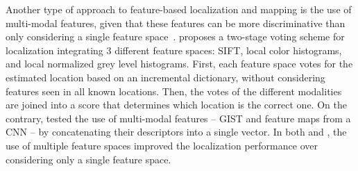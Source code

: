 Another type of approach to feature-based localization and mapping is the use of multi-modal features, given that these features can be more discriminative than only considering a single feature space~\parencite{latif-et-al:2017:016}.
\cite{filliat:2007:364080} proposes a two-stage voting scheme for localization integrating 3 different feature spaces: SIFT, local color histograms, and local normalized grey level histograms. First, each feature space votes for the estimated location based on an incremental dictionary, without considering features seen in all known locations. Then, the votes of the different modalities are joined into a score that determines which location is the correct one.
On the contrary, \cite{latif-et-al:2017:016} tested the use of multi-modal features -- GIST and feature maps from a CNN -- by concatenating their descriptors into a single vector. 
In both \cite{filliat:2007:364080} and \cite{latif-et-al:2017:016}, the use of multiple feature spaces improved the localization performance over considering only a single feature space.

